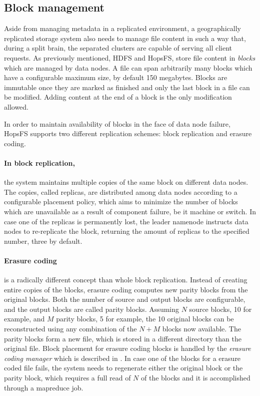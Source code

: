 \subsection{Block management}
Aside from managing metadata in a replicated environment, a geographically replicated storage system also needs to manage file content in such a way that, during a split brain, the separated clusters are capable of serving all client requests.
As previously mentioned, HDFS and HopsFS, store file content in \emph{blocks} which are managed by data nodes.
A file can span arbitrarily many blocks which have a configurable maximum size, by default 150 megabytes.
Blocks are immutable once they are marked as finished and only the last block in a file can be modified.
Adding content at the end of a block is the only modification allowed.

In order to maintain availability of blocks in the face of data node failure, HopsFS supports two different replication schemes: block replication and erasure coding.

\paragraph{In block replication,} the system maintains multiple copies of the same block on different data nodes.
The copies, called replicas, are distributed among data nodes according to a configurable placement policy, which aims to minimize the number of blocks which are unavailable as a result of component failure, be it machine or switch.
In case one of the replicas is permanently lost, the leader namenode instructs data nodes to re-replicate the block, returning the amount of replicas to the specified number, three by default.

\paragraph{Erasure coding} is a radically different concept than whole block replication.
Instead of creating entire copies of the blocks, erasure coding computes new parity blocks from the original blocks.
Both the number of source and output blocks are configurable, and the output blocks are called parity blocks.
Assuming $N$ source blocks, 10 for example, and $M$ parity blocks, 5 for example, the 10 original blocks can be reconstructed using any combination of the $N + M$ blocks now available.
The parity blocks form a new file, which is stored in a different directory than the original file.
Block placement for erasure coding blocks is handled by the \emph{erasure coding manager} which is described in \cite{grohsschmiedt2014making}.
In case one of the blocks for a erasure coded file fails, the system needs to regenerate either the original block or the parity block, which requires a full read of $N$ of the blocks and it is accomplished through a mapreduce job.

